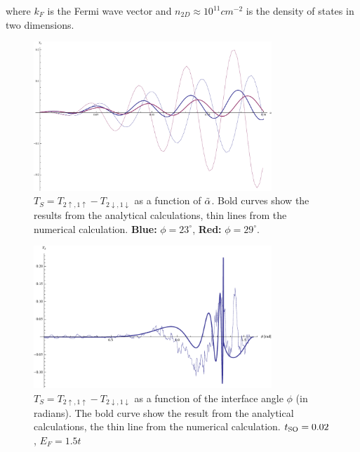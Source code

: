where $k_F$ is the Fermi wave vector and $n_{2D} \approx 10^{11} cm^{-2}$ is
the density of states in two dimensions.

\begin{figure}
    \begin{center}
        \includegraphics[width=0.8\textwidth]{comparison-over-alpha.pdf}
    \end{center}
    \caption{$T_S = T_{2\uparrow,1\uparrow} - T_{2\downarrow,1\downarrow}$ as
        a function of $\tilde \alpha$. Bold curves show the results from the analytical
        calculations, thin lines from the numerical calculation.
        \textbf{Blue:} $\phi = 23^\circ$, \textbf{Red:} $\phi = 29^\circ$.
    }
    \label{fig:a-n-matching-alpha}
\end{figure}
\begin{figure}
    \begin{center}
        \includegraphics[width=0.8\textwidth]{comparison-over-phi.pdf}
    \end{center}
    \caption{$T_S = T_{2\uparrow,1\uparrow} - T_{2\downarrow,1\downarrow}$ as
        a function of the interface angle $\phi$ (in radians). The bold curve
            show the result from the analytical calculations, the thin line
            from the numerical calculation. $t_{\textnormal{SO}} = 0.02$, $E_F = 1.5t$
    }
    \label{fig:a-n-matching-phi}
\end{figure}
